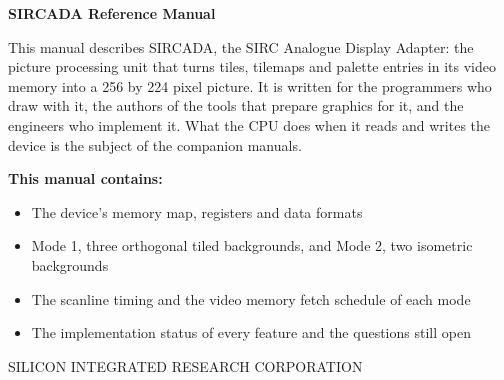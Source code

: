 \clearpage
\thispagestyle{empty}
\begin{center}

	\vspace*{1.5cm}

	{\Large\bfseries SIRCADA Reference Manual}

	\vspace{1cm}

	\begin{minipage}{0.8\textwidth}
		This manual describes SIRCADA, the SIRC Analogue Display Adapter: the picture processing unit that turns tiles, tilemaps and palette
		entries in its video memory into a 256 by 224 pixel picture. It is written for the programmers who draw with it,
		the authors of the tools that prepare graphics for it, and the engineers who implement it. What the CPU does when
		it reads and writes the device is the subject of the companion manuals.

		\vspace{0.6cm}

		\textbf{This manual contains:}
		\begin{itemize}
			\item The device's memory map, registers and data formats
			\item Mode 1, three orthogonal tiled backgrounds, and Mode 2, two isometric backgrounds
			\item The scanline timing and the video memory fetch schedule of each mode
			\item The implementation status of every feature and the questions still open
		\end{itemize}
	\end{minipage}

	\vfill

	{\small SILICON INTEGRATED RESEARCH CORPORATION}

\end{center}
